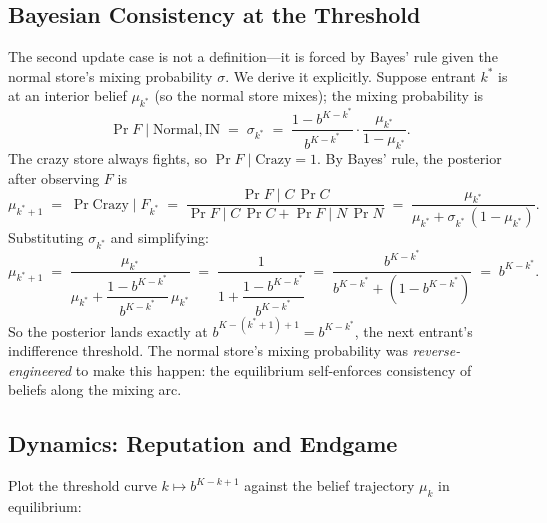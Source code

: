 \subsection{Bayesian Consistency at the Threshold}

The second update case is not a definition---it is forced by Bayes' rule given the normal store's mixing probability $\sigma$. We derive it explicitly. Suppose entrant $k^*$ is at an interior belief $\mu_{k^*}$ (so the normal store mixes); the mixing probability is
\[
  \Pr{F \mid \text{Normal}, \text{IN}} \;=\; \sigma_{k^*} \;=\; \frac{1 - b^{K-k^*}}{b^{K-k^*}} \cdot \frac{\mu_{k^*}}{1 - \mu_{k^*}}.
\]
The crazy store always fights, so $\Pr{F \mid \text{Crazy}} = 1$. By Bayes' rule, the posterior after observing $F$ is
\[
  \mu_{k^* + 1} \;=\; \Pr{\text{Crazy} \mid F_{k^*}}
  \;=\; \frac{\Pr{F \mid C}\,\Pr{C}}{\Pr{F \mid C}\,\Pr{C} + \Pr{F \mid N}\,\Pr{N}}
  \;=\; \frac{\mu_{k^*}}{\mu_{k^*} + \sigma_{k^*}\,(1 - \mu_{k^*})}.
\]
Substituting $\sigma_{k^*}$ and simplifying:
\[
  \mu_{k^* + 1}
  \;=\; \frac{\mu_{k^*}}{\mu_{k^*} + \dfrac{1 - b^{K-k^*}}{b^{K-k^*}}\,\mu_{k^*}}
  \;=\; \frac{1}{1 + \dfrac{1 - b^{K-k^*}}{b^{K-k^*}}}
  \;=\; \frac{b^{K-k^*}}{b^{K-k^*} + (1 - b^{K-k^*})}
  \;=\; b^{K-k^*}.
\]
So the posterior lands exactly at $b^{K-(k^*+1)+1} = b^{K-k^*}$, the next entrant's indifference threshold. The normal store's mixing probability was \emph{reverse-engineered} to make this happen: the equilibrium self-enforces consistency of beliefs along the mixing arc.

\subsection{Dynamics: Reputation and Endgame}

Plot the threshold curve $k \mapsto b^{K-k+1}$ against the belief trajectory $\mu_k$ in equilibrium:

